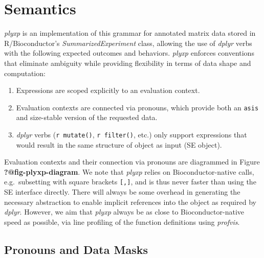 \documentclass[
  letterpaper,
  DIV=11,
  numbers=noendperiod]{scrartcl}
\providecommand{\tightlist}{%
  \setlength{\itemsep}{0pt}\setlength{\parskip}{0pt}}
\begin{document}
\section{Semantics}\label{semantics}

\emph{plyxp} is an implementation of this grammar for annotated matrix
data stored in R/Bioconductor's \emph{SummarizedExperiment} class,
allowing the use of \emph{dplyr} verbs with the following expected
outcomes and behaviors. \emph{plyxp} enforces conventions that eliminate
ambiguity while providing flexibility in terms of data shape and
computation:

\begin{enumerate}
\def\labelenumi{\arabic{enumi}.}
\tightlist
\item
  Expressions are scoped explicitly to an evaluation context.
\item
  Evaluation contexts are connected via pronouns, which provide both an
  \texttt{asis} and size-stable version of the requested data.
\item
  \emph{dplyr} verbs (\texttt{r\ mutate()}, \texttt{r\ filter()}, etc.)
  only support expressions that would result in the same structure of
  object as input (SE object).
\end{enumerate}

Evaluation contexts and their connection via pronouns are diagrammed in
Figure \textbf{?@fig-plyxp-diagram}. We note that \emph{plyxp} relies on
Bioconductor-native calls, e.g.~subsetting with square brackets
\texttt{{[},{]}}, and is thus never faster than using the SE interface
directly. There will always be some overhead in generating the necessary
abstraction to enable implicit references into the object as required by
\emph{dplyr}. However, we aim that \emph{plyxp} always be as close to
Bioconductor-native speed as possible, via line profiling of the
function definitions using \emph{profvis}.

\subsection{Pronouns and Data Masks}\label{pronouns-and-data-masks}
\end{document}
